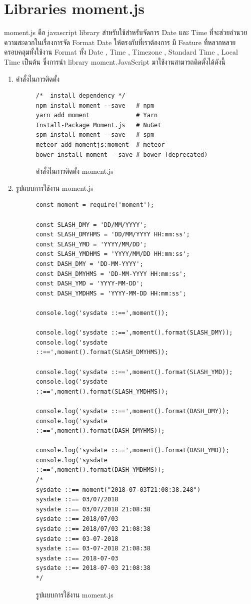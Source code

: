 \section{Libraries moment.js}
moment.js คือ javascript library สำหรับใช้สำหรับจัดการ Date และ Time ที่จะช่วยอำนวยความสะดวกในเรื่องการจัด Format Date ให้ตรงกับที่เราต้องการ
มี Feature ที่หลากหลายครอบคลุมทั้งใช้งาน Format ทั้ง Date , Time , Timezone , Standard Time , Local Time เป็นต้น ซึ่งการนำ library moment.JavaScript 
มาใช้งานสามารถติดตั้งได้ดังนี้
\begin{enumerate}
	\item คำสั่งในการติดตั้ง
	\begin{figure}[H]
		{\begin{lstlisting}
/*  install dependency */
npm install moment --save   # npm
yarn add moment             # Yarn
Install-Package Moment.js   # NuGet
spm install moment --save   # spm
meteor add momentjs:moment  # meteor
bower install moment --save # bower (deprecated)
		\end{lstlisting}}
	\centering
		\caption{คำสั่งในการติดตั้ง moment.js}
		\label{Fig:API Web Speech}
	\end{figure}

	\item รูปแบบการใช้งาน moment.js
	\begin{figure}[H]
		{\begin{lstlisting}
const moment = require('moment');

const SLASH_DMY = 'DD/MM/YYYY';
const SLASH_DMYHMS = 'DD/MM/YYYY HH:mm:ss';
const SLASH_YMD = 'YYYY/MM/DD';
const SLASH_YMDHMS = 'YYYY/MM/DD HH:mm:ss';
const DASH_DMY = 'DD-MM-YYYY';
const DASH_DMYHMS = 'DD-MM-YYYY HH:mm:ss';
const DASH_YMD = 'YYYY-MM-DD';
const DASH_YMDHMS = 'YYYY-MM-DD HH:mm:ss';
			
console.log('sysdate ::==',moment());
			
console.log('sysdate ::==',moment().format(SLASH_DMY));
console.log('sysdate ::==',moment().format(SLASH_DMYHMS));
			
console.log('sysdate ::==',moment().format(SLASH_YMD));
console.log('sysdate ::==',moment().format(SLASH_YMDHMS));
			
console.log('sysdate ::==',moment().format(DASH_DMY));
console.log('sysdate ::==',moment().format(DASH_DMYHMS));
			
console.log('sysdate ::==',moment().format(DASH_YMD));
console.log('sysdate ::==',moment().format(DASH_YMDHMS));
/*
sysdate ::== moment("2018-07-03T21:08:38.248")
sysdate ::== 03/07/2018
sysdate ::== 03/07/2018 21:08:38
sysdate ::== 2018/07/03
sysdate ::== 2018/07/03 21:08:38
sysdate ::== 03-07-2018
sysdate ::== 03-07-2018 21:08:38
sysdate ::== 2018-07-03
sysdate ::== 2018-07-03 21:08:38
*/
		\end{lstlisting}}
	\centering
		\caption{รูปแบบการใช้งาน moment.js}
		\label{Fig:API Web Speech}
	\end{figure}


\end{enumerate}
